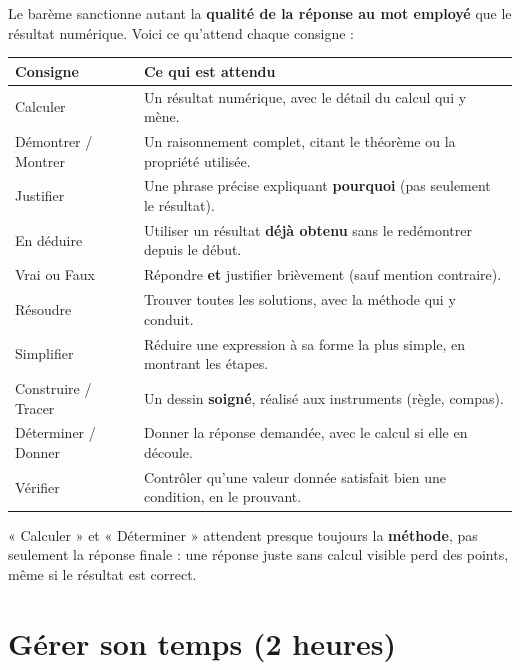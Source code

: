 \begin{propriete}
Le barème sanctionne autant la \textbf{qualité de la réponse au mot employé} que le
résultat numérique. Voici ce qu'attend chaque consigne :
\end{propriete}

\begin{center}
\small
\begin{tabular}{ll}
\toprule
\textbf{Consigne} & \textbf{Ce qui est attendu} \\
\midrule
Calculer & Un résultat numérique, avec le détail du calcul qui y mène. \\
Démontrer / Montrer & Un raisonnement complet, citant le théorème ou la propriété utilisée. \\
Justifier & Une phrase précise expliquant \textbf{pourquoi} (pas seulement le résultat). \\
En déduire & Utiliser un résultat \textbf{déjà obtenu} sans le redémontrer depuis le début. \\
Vrai ou Faux & Répondre \textbf{et} justifier brièvement (sauf mention contraire). \\
Résoudre & Trouver toutes les solutions, avec la méthode qui y conduit. \\
Simplifier & Réduire une expression à sa forme la plus simple, en montrant les étapes. \\
Construire / Tracer & Un dessin \textbf{soigné}, réalisé aux instruments (règle, compas). \\
Déterminer / Donner & Donner la réponse demandée, avec le calcul si elle en découle. \\
Vérifier & Contrôler qu'une valeur donnée satisfait bien une condition, en le prouvant. \\
\bottomrule
\end{tabular}
\end{center}

\begin{remarque}
« Calculer » et « Déterminer » attendent presque toujours la \textbf{méthode}, pas
seulement la réponse finale : une réponse juste sans calcul visible perd des points, même
si le résultat est correct.
\end{remarque}

\section{Gérer son temps (2 heures)}

